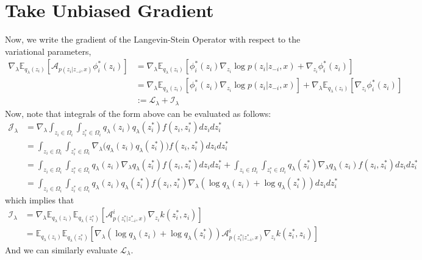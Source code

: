 \documentclass[12pt,twoside]{article}
\begin{document}
\section{Take Unbiased Gradient}

Now, we write the gradient of the Langevin-Stein Operator with respect to the variational parameters,
\begin{align*}
\nabla_{\lambda} \mathbb{E}_{q_{\lambda}(z_i)}[\mathcal{A}_{p(z_{i}|z_{-i},x)} \phi_i^{*}(z_i)] &=  \nabla_{\lambda} \mathbb{E}_{q_{\lambda}(z_{i})}[ \phi_{i}^{*}(z_{i}) \nabla_{z_{i}}\log p(z_{i}|z_{-i},x) + \nabla_{z_{i}} \phi_{i}^{*}(z_{i})] \\
&= \nabla_{\lambda} \mathbb{E}_{q_{\lambda}(z_{i})}[ \phi_{i}^{*}(z_{i}) \nabla_{z_{i}}\log p(z_{i}|z_{-i},x)] + \nabla_{\lambda} \mathbb{E}_{q_{\lambda}(z_{i})}[\nabla_{z_{i}} \phi_{i}^{*}(z_{i})] \\
& := \mathcal{L}_{\lambda} + \mathcal{I}_{\lambda}
\end{align*}
Now, note that integrals of the form above can be evaluated as follows:
\begin{align*}
\mathcal{J}_{\lambda} &= \nabla_{\lambda} \int_{z_{i} \in \Omega_{i}} \int_{z^{*}_{i} \in \Omega_{i}} q_{\lambda}(z_i) q_{\lambda}(z^{*}_i) f(z_i, z^{*}_i) dz_{i} dz_{i}^{*} \\
&= \int_{z_{i} \in \Omega_{i}} \int_{z^{*}_{i} \in \Omega_{i}} \nabla_{\lambda} \big( q_{\lambda}(z_i) q_{\lambda}(z^{*}_i) \big) f(z_i, z^{*}_i) dz_{i} dz_{i}^{*} \\
&=  \int_{z_{i} \in \Omega_{i}} \int_{z^{*}_{i} \in \Omega_{i}} q_{\lambda}(z_i) \nabla_{\lambda} q_{\lambda}(z^{*}_{i}) f(z_i, z^{*}_i) dz_{i} dz_{i}^{*} + \int_{z_{i} \in \Omega_{i}} \int_{z^{*}_{i} \in \Omega_{i}} q_{\lambda}(z_{i}^{*}) \nabla_{\lambda} q_{\lambda}(z_{i}) f(z_i, z^{*}_i) dz_{i} dz_{i}^{*} \\
&= \int_{z_{i} \in \Omega_{i}} \int_{z^{*}_{i} \in \Omega_{i}} q_{\lambda}(z_i) q_{\lambda}(z^{*}_i) f(z_i, z^{*}_i) \nabla_{\lambda}( \log q_{\lambda}(z_i) + \log q_{\lambda}(z^{*}_{i})) dz_{i} dz_{i}^{*}
\end{align*}
which implies that
\begin{align}
\mathcal{I}_{\lambda} &= \nabla_{\lambda}\mathbb{E}_{q_{\lambda}(z_{i})} \mathbb{E}_{q_{\lambda}(z^{*}_{i})}[ \mathcal{A}^{i}_{p(z^{*}_{i}|z^{*}_{-i}, x)} \nabla_{z_{i}} k(z^{*}_i, z_i) ] \\
&= \mathbb{E}_{q_{\lambda}(z_{i})} \mathbb{E}_{q_{\lambda}(z^{*}_{i})} [  \nabla_{\lambda}(\log q_{\lambda}(z_i) + \log q_{\lambda}(z^{*}_{i}) ) \mathcal{A}^{i}_{p(z^{*}_{i}|z^{*}_{-i}, x)} \nabla_{z_{i}} k(z^{*}_i, z_i) ]
\end{align}
And we can similarly evaluate $\mathcal{L}_{\lambda}$.
\end{document}
